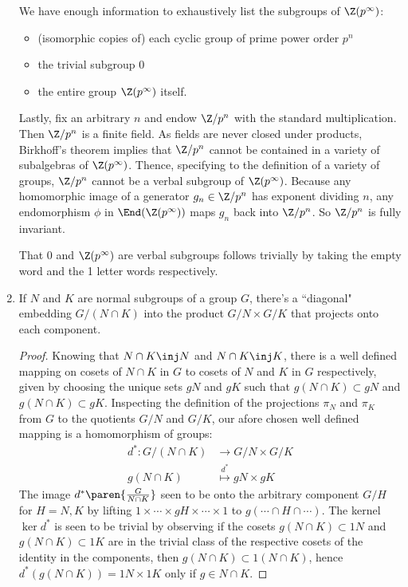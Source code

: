\documentclass[onesided]{ccg-pset}
\begin{document}
\begin{enumerate}
We have enough information to exhaustively list the subgroups of $\Z(p^\infty)$:
\begin{itemize}
    \item (isomorphic copies of) each cyclic group of prime power order $p^n$
    \item the trivial subgroup $0$
    \item the entire group $\Z(p^\infty)$ itself.
\end{itemize}

Lastly, fix an arbitrary $n$ and endow $\Z/p^n$ with the standard multiplication. Then $\Z/p^n$ is a finite field. As fields are never closed under products, Birkhoff's theorem implies that $\Z/p^n$ cannot be contained in a variety of subalgebras of $\Z(p^\infty)$. Thence, specifying to the definition of a variety of groups, $\Z/p^n$ cannot be a verbal subgroup of $\Z(p^\infty)$. Because any homomorphic image of a generator $g_n \in \Z/p^n$ has exponent dividing $n$, any endomorphism $\phi$ in $\End(\Z(p^\infty))$ maps $g_n$ back into $\Z/p^n$. So $\Z/p^n$ is fully invariant.

That $0$ and $\Z(p^\infty)$ are verbal subgroups follows trivially by taking the empty word and the 1 letter words respectively.

\item If $N$ and $K$ are normal subgroups of a group $G$, there's a ``diagonal" embedding $G/(N\cap K)$ into the product $G/N \times G/K$ that projects onto each component.

\begin{proof}
Knowing that $N\cap K \inj N$ and $N\cap K \inj K$, there is a well defined mapping on cosets of $N \cap K$ in $G$ to cosets of $N$ and $K$ in $G$ respectively, given by choosing the unique sets $gN$ and $gK$ such that $g(N\cap K) \subset gN$ and $g(N\cap K) \subset gK$. Inspecting the definition of the projections $\pi_N$ and $\pi_K$ from $G$ to the quotients $G/N$ and $G/K$, our afore chosen well defined mapping is a homomorphism of groups:
\begin{align*}
    d^* \colon 
    G/(N\cap K) &\to G/N \times G/K\\
    g(N\cap K) &\overset{d^*}{\mapsto} gN \times gK
\end{align*}
    The image $d^*\paren{\frac{G}{N \cap K}}$ seen to be onto the arbitrary component $G/H$ for $H = N, K$ by lifting $1 \times \cdots \times gH \times \cdots \times 1$ to $g(\cdots \cap H \cap \cdots)$. The kernel $\ker d^*$ is seen to be trivial by observing if the cosets $g(N \cap K) \subset 1N$ and $g(N \cap K) \subset 1K$ are in the trivial class of the respective cosets of the identity in the components, then $g(N \cap K) \subset 1(N \cap K)$, hence $d^*(g(N \cap K)) = 1N \times 1K$ only if $g \in N \cap K$.
\end{proof}


\end{enumerate}
\end{document}
